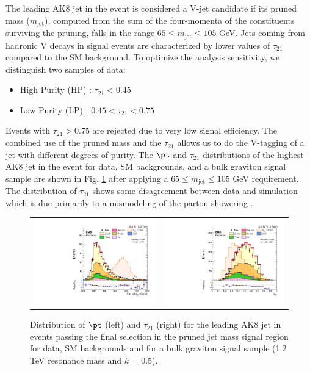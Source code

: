 \par The leading AK8 jet in the event is considered a V-jet candidate if its pruned mass ($m_{\text{jet}}$), computed from the sum of the four-momenta of the constituents surviving the pruning, falls in the range $65\leq  m_{\text{jet}} \leq105$ GeV. Jets coming from hadronic V decays in signal events are characterized by lower values of $\tau_{21}$  compared to the SM background. To optimize the analysis sensitivity, we distinguish two samples of data:
\begin{itemize}
\item
High Purity (HP) :  $\tau_{21}< 0.45$
\item
Low Purity (LP)  : $0.45 < \tau_{21} < 0.75$
\end{itemize}

Events with $\tau_{21} > 0.75$  are rejected due to very low signal efficiency.
The combined use of the pruned mass and the $\tau_{21}$ allows us to do the V-tagging of a jet with different degrees of purity.
The $\pt$ and $\tau_{21}$ distributions of the highest AK8 jet in the event for data, SM backgrounds, and a bulk graviton
signal sample are shown in Fig. \ref{fig:Vtagg}  after applying a $65\leq  m_{\text{jet}} \leq105$ GeV requirement.
The distribution of $\tau_{21}$  shows some disagreement between data and simulation which is due primarily to a mismodeling of the parton showering \cite{CMS-PAS-EXO-12-021}.

\begin{figure}[!ht]
\caption{ Distribution of $\pt$ (left) and $\tau_{21}$ (right) for the leading AK8 jet in events passing the
final selection in the pruned jet mass signal region for data, SM backgrounds and for a bulk graviton signal sample (1.2 TeV resonance mass and $\tilde{k}$ = 0.5).}
\begin{tabular}{cc}
  \includegraphics[width=230pt]{figures/can_h_ptZjj.pdf} &
  \includegraphics[width=230pt]{figures/can_h_tau21.pdf}\\
\end{tabular}
\label{fig:Vtagg}
\end{figure}

